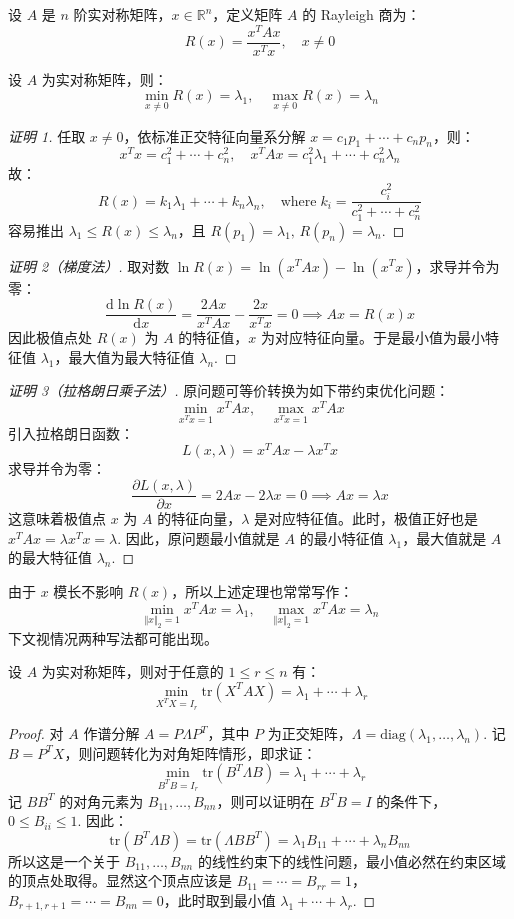 \begin{definition}[Rayleigh 商]
设 $A$ 是 $n$ 阶实对称矩阵，$x\in\mathbb R^n$，定义矩阵 $A$ 的 Rayleigh 商为：
\[
    R(x)=\frac{x^TAx}{x^Tx},\quad x\neq 0
\]
\end{definition}
\begin{theorem}
设 $A$ 为实对称矩阵，则：
\[
    \min_{x\neq 0}R(x)=\lambda_1,\quad\max_{x\neq 0}R(x)=\lambda_n
\]
\end{theorem}
\begin{proof}[证明 1]
任取 $x\neq 0$，依标准正交特征向量系分解 $x=c_1p_1+\cdots+c_np_n$，则：
\[
    x^Tx=c_1^2+\cdots+c_n^2,\quad x^TAx=c_1^2\lambda_1+\cdots+c_n^2\lambda_n
\]
故：
\[
    R(x)=k_1\lambda_1+\cdots+k_n\lambda_n,\quad\text{where}\; k_i=\frac{c_i^2}{c_1^2+\cdots+c_n^2}
\]
容易推出 $\lambda_1\leq R(x)\leq\lambda_n$，且 $R(p_1)=\lambda_1,\,R(p_n)=\lambda_n$.
\end{proof}
\begin{proof}[证明 2（梯度法）]
取对数 $\ln R(x)=\ln (x^TAx)-\ln(x^Tx)$，求导并令为零：
\[
    \frac{\mathrm d\ln R(x)}{\mathrm dx}=\frac{2Ax}{x^TAx}-\frac{2x}{x^Tx}=0\implies Ax=R(x)x
\]
因此极值点处 $R(x)$ 为 $A$ 的特征值，$x$ 为对应特征向量。于是最小值为最小特征值 $\lambda_1$，最大值为最大特征值 $\lambda_n$.
\end{proof}
\begin{proof}[证明 3（拉格朗日乘子法）]
原问题可等价转换为如下带约束优化问题：
\[
    \min_{x^Tx=1} x^TAx,\quad\max_{x^Tx=1} x^TAx
\]
引入拉格朗日函数：
\[
    L(x,\lambda)=x^TAx-\lambda x^Tx
\]
求导并令为零：
\[
    \frac{\partial L(x,\lambda)}{\partial x}=2Ax-2\lambda x=0\implies Ax=\lambda x
\]
这意味着极值点 $x$ 为 $A$ 的特征向量，$\lambda$ 是对应特征值。此时，极值正好也是 $x^TAx=\lambda x^Tx=\lambda$. 因此，原问题最小值就是 $A$ 的最小特征值 $\lambda_1$，最大值就是 $A$ 的最大特征值 $\lambda_n$.
\end{proof}

\begin{remark}
由于 $x$ 模长不影响 $R(x)$，所以上述定理也常常写作：
\[
    \min_{\Vert x\Vert_2=1}x^TAx=\lambda_1,\quad\max_{\Vert x\Vert_2=1}x^TAx=\lambda_n
\]
下文视情况两种写法都可能出现。
\end{remark}

\begin{theorem}
设 $A$ 为实对称矩阵，则对于任意的 $1\leq r\leq n$ 有：
\[
    \min_{X^TX=I_r}\text{tr}(X^TAX)=\lambda_1+\cdots+\lambda_r
\]
\end{theorem}
\begin{proof}
对 $A$ 作谱分解 $A=P\Lambda P^T$，其中 $P$ 为正交矩阵，$\Lambda=\text{diag}(\lambda_1,\ldots,\lambda_n)$. 记 $B=P^TX$，则问题转化为对角矩阵情形，即求证：
\[
    \min_{B^TB=I_r}\text{tr}(B^T\Lambda B)=\lambda_1+\cdots+\lambda_r
\]
记 $BB^T$ 的对角元素为 $B_{11},\ldots,B_{nn}$，则可以证明在 $B^TB=I$ 的条件下，$0\leq B_{ii}\leq 1$.  因此：
\[
    \text{tr}(B^T\Lambda B)=\text{tr}(\Lambda BB^T)=\lambda_1B_{11}+\cdots+\lambda_n B_{nn}
\]
所以这是一个关于 $B_{11},\ldots,B_{nn}$ 的线性约束下的线性问题，最小值必然在约束区域的顶点处取得。显然这个顶点应该是 $B_{11}=\cdots=B_{rr}=1$，$B_{r+1,r+1}=\cdots=B_{nn}=0$，此时取到最小值 $\lambda_1+\cdots+\lambda_r$.
\end{proof}

